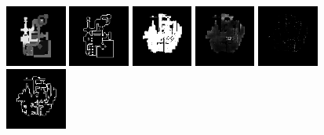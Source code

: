 \begin{figure}[h!]
\begin{minipage}[b]{\linewidth}
	\begin{center}
		\includegraphics[width=2cm]{figures/results/samples/cond/sample29_map_heightmap_true.png}
		\includegraphics[width=2cm]{figures/results/samples/cond/sample29_map_wallmap_true.png}
		\hfill 
		\includegraphics[width=2cm]{figures/results/samples/cond/sample29_map_floormap_generated.png}
		\includegraphics[width=2cm]{figures/results/samples/cond/sample29_map_heightmap_generated.png}
		\includegraphics[width=2cm]{figures/results/samples/cond/sample29_map_thingsmap_generated.png}
		\includegraphics[width=2cm]{figures/results/samples/cond/sample29_map_wallmap_generated.png}
	\end{center}
	

\end{minipage}
\end{figure}
